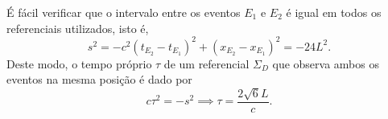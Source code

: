 É fácil verificar que o intervalo entre os eventos \(E_1\) e \(E_2\) é igual em todos os referenciais utilizados, isto é,
\begin{equation*}
    s^2 = -c^2\left(t_{E_2} - t_{E_1}\right)^2 + \left(x_{E_2} - x_{E_1}\right)^2 = -24L^2.
\end{equation*}
Deste modo, o tempo próprio \(\tau\) de um referencial \(\Sigma_D\) que observa ambos os eventos na mesma posição é dado por
\begin{equation*}
    c\tau^2 = -s^2 \implies \tau = \frac{2\sqrt{6}L}{c}.
\end{equation*}
